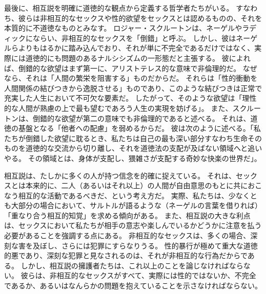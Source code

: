 \documentclass[paper=a4,book,openany]{jlreq} \usepackage{mystyle}
\begin{document}
最後に、相互説を明確に道徳的な観点から定義する哲学者たちがいる。
すなわち、彼らは非相互的なセックスや性的欲望をセックスとは認めるものの、それを本質的に不道徳なものとみなす。
ロジャー・スクルートンは、ネーゲルやラディックにならい、非相互的なセックスを「倒錯」と呼ぶ。
しかし、彼はネーゲルらよりもはるかに踏み込んでおり、それが単に不完全であるだけではなく、実際には道徳的にも問題のあるナルシシズムの一形態だと主張する。
彼によれば、倒錯的な欲望はまず第一に、アリストテレス的な意味で非倫理的だ。
なぜなら、それは「人間の繁栄を阻害する」ものだからだ。
それらは「性的衝動を人間関係の結びつきから逸脱させる」ものであり、このような結びつきは正常で充実した人生において不可欠な要素だ。
したがって、そのような欲望は「理性的な人間が熟慮の上で最も望むであろう人生の実現を妨げる」\citep[p.317]{scruton06:_sexual_desir}。
また、スクルートンは、倒錯的な欲望が第二の意味でも非倫理的であると述べる。
それは、道徳の基盤となる「他者への配慮」を弱めるからだ。
彼は次のように述べる。「私たちが倒錯した欲望に耽るとき、私たちは自己の最も深い部分{\DDASH}すなわち生命そのもの{\DDASH}を道徳的な交流から切り離し、それを道徳法の支配が及ばない領域へと追いやる。
その領域とは、身体が支配し、猥雑さが支配する奇妙な快楽の世界だ」\citep[p.289]{scruton06:_sexual_desir}。

相互説は、たしかに多くの人が持つ信念を的確に捉えている。
それは、セックスとは本来的に、二人（あるいはそれ以上）の人間が自由意思のもとに共におこなう相互的な活動であるべきだ、という考え方だ。
実際、私たちは、少なくとも大部分の場合において、サルトルが語るような（ネーゲルの言葉を借りれば）「重なり合う相互的知覚」を求める傾向がある。
また、相互説の大きな利点は、セックスにおいて私たちが相手の意志や楽しんでいるかどうかに注意を払う必要があることを強調する点にある。
非相互的なセックスは、多くの場合、深刻な害を及ぼし、さらには犯罪にすらなりうる。
性的暴行が極めて重大な道徳的悪であり、深刻な犯罪と見なされるのは、それが非相互的な行為だからである\citep[cf.][]{woollard19:_promis_paedop_rape_signif_sexual}。
しかし、相互説の擁護者たちは、これ以上のことを論じなければならない。
彼らは、非相互的なセックスがすべて、実際には性的ではないか、不完全であるか、あるいはなんらかの問題を抱えていることを示さなければならない。
\end{document}
